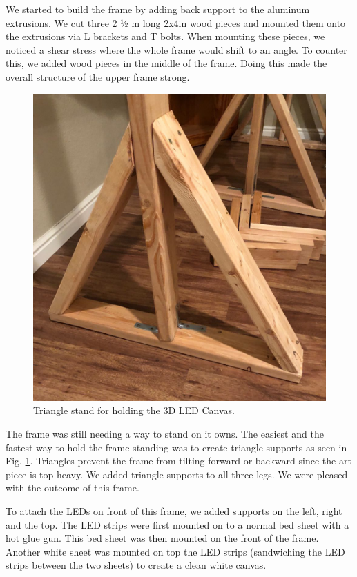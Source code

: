 \documentclass[11pt]{IEEEtran}
\begin{document}
We started to build the frame by adding back support to the aluminum extrusions. We cut three 2 ½ m long 2x4in wood pieces and mounted them onto the extrusions via L brackets and T bolts. When mounting these pieces, we noticed a shear stress where the whole frame would shift to an angle. To counter this, we added wood pieces in the middle of the frame. Doing this made the overall structure of the upper frame strong.

\begin{figure}
  \centering
  \includegraphics[width=\columnwidth]{image5.png}
  \caption{Triangle stand for holding the 3D LED Canvas.}
  \label{fig:framelegs}
\end{figure}

The frame was still needing a way to stand on it owns. The easiest and the fastest way to hold the frame standing was to create triangle supports as seen in Fig. \ref{fig:framelegs}. Triangles prevent the frame from tilting forward or backward since the art piece is top heavy. We added triangle supports to all three legs. We were pleased with the outcome of this frame.

To attach the LEDs on front of this frame, we added supports on the left, right and the top. The LED strips were first mounted on to a normal bed sheet with a hot glue gun. This bed sheet was then mounted on the front of the frame. Another white sheet was mounted on top the LED strips (sandwiching the LED strips between the two sheets) to create a clean white canvas.
\end{document}

